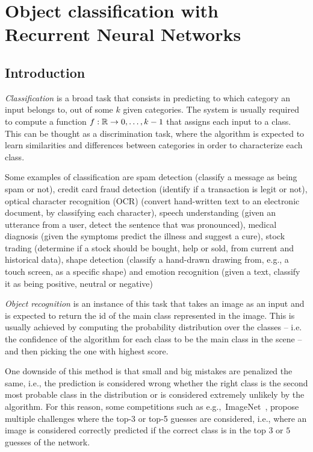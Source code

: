 \chapter{Object classification with Recurrent Neural Networks}\label{sec:renet}

\section{Introduction}\label{sec:renet_intro}

\emph{Classification} is a broad task that consists in predicting to which
category an input belongs to, out of some $k$ given categories. The system is
usually required to compute a function $f: \mathbb{R} \to {0, \dots, k-1}$ that
assigns each input to a class. This can be thought as a discrimination task,
where the algorithm is expected to learn similarities and differences between
categories in order to characterize each class.

Some examples of classification are spam detection (classify a message as being
spam or not), credit card fraud detection (identify if a transaction is legit
or not), optical character recognition (OCR) (convert hand-written text to an
electronic document, by classifying each character), speech understanding
(given an utterance from a user, detect the sentence that was pronounced),
medical diagnosis (given the symptoms predict the illness and suggest a cure),
stock trading (determine if a stock should be bought, help or sold, from
current and historical data), shape detection (classify a hand-drawn drawing
from, e.g., a touch screen, as a specific shape) and emotion recognition (given
a text, classify it as being positive, neutral or negative)

\emph{Object recognition} is an instance of this task that takes an image as an
input and is expected to return the id of the main class represented in the
image. This is usually achieved by computing the probability distribution over
the classes -- i.e. the confidence of the algorithm for each class to be the
main class in the scene -- and then picking the one with highest score.

One downside of this method is that small and big mistakes are penalized the
same, i.e., the prediction is considered wrong whether the right class is the
second most probable class in the distribution or is considered extremely
unlikely by the algorithm. For this reason, some competitions such as
e.g.,~ImageNet~\citep{imagenet_cvpr09, ILSVRCarxiv14}, propose multiple
challenges where the top-3 or top-5 guesses are considered, i.e., where an
image is considered correctly predicted if the correct class is in the top
$3$ or $5$ guesses of the network.


